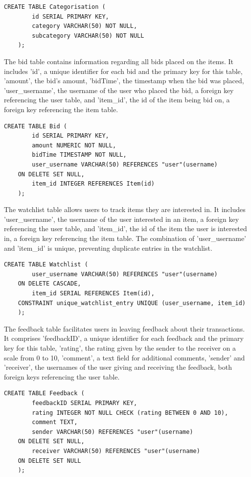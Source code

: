 \begin{lstlisting}[style=sqlStyle]
	CREATE TABLE Categorisation (
		id SERIAL PRIMARY KEY,
		category VARCHAR(50) NOT NULL,
		subcategory VARCHAR(50) NOT NULL
	);
\end{lstlisting}

The bid table contains information regarding all bids placed on the items. It includes 'id', a unique identifier for each bid and the primary key for this table, 'amount', the bid's amount, 'bidTime', the timestamp when the bid was placed, 'user\_username', the username of the user who placed the bid, a foreign key referencing the user table, and 'item\_id', the id of the item being bid on, a foreign key referencing the item table.

\begin{lstlisting}[style=sqlStyle]
	CREATE TABLE Bid (
		id SERIAL PRIMARY KEY,
		amount NUMERIC NOT NULL,
		bidTime TIMESTAMP NOT NULL,
		user_username VARCHAR(50) REFERENCES "user"(username)
	ON DELETE SET NULL,
		item_id INTEGER REFERENCES Item(id)
	);
\end{lstlisting}

The watchlist table allows users to track items they are interested in. It includes 'user\_username', the username of the user interested in an item, a foreign key referencing the user table, and 'item\_id', the id of the item the user is interested in, a foreign key referencing the item table. The combination of 'user\_username' and 'item\_id' is unique, preventing duplicate entries in the watchlist.

\begin{lstlisting}[style=sqlStyle]
	CREATE TABLE Watchlist (
		user_username VARCHAR(50) REFERENCES "user"(username)
	ON DELETE CASCADE,
		item_id SERIAL REFERENCES Item(id),
	CONSTRAINT unique_watchlist_entry UNIQUE (user_username, item_id)
	);
\end{lstlisting}

The feedback table facilitates users in leaving feedback about their transactions. It comprises 'feedbackID', a unique identifier for each feedback and the primary key for this table, 'rating', the rating given by the sender to the receiver on a scale from 0 to 10, 'comment', a text field for additional comments, 'sender' and 'receiver', the usernames of the user giving and receiving the feedback, both foreign keys referencing the user table.

\begin{lstlisting}[style=sqlStyle]
	CREATE TABLE Feedback (
		feedbackID SERIAL PRIMARY KEY,
		rating INTEGER NOT NULL CHECK (rating BETWEEN 0 AND 10),
		comment TEXT,
		sender VARCHAR(50) REFERENCES "user"(username)
	ON DELETE SET NULL,
		receiver VARCHAR(50) REFERENCES "user"(username)
	ON DELETE SET NULL
	);
\end{lstlisting}

